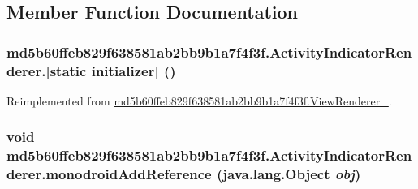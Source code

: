 \subsection{Member Function Documentation}
\hypertarget{classmd5b60ffeb829f638581ab2bb9b1a7f4f3f_1_1_activity_indicator_renderer_ed6f0fb925a7f5d4ef808b3016a59e91}{
\subsubsection[{[static initializer]}]{\setlength{\rightskip}{0pt plus 5cm}md5b60ffeb829f638581ab2bb9b1a7f4f3f.ActivityIndicatorRenderer.\mbox{[}static initializer\mbox{]} ()}}
\label{classmd5b60ffeb829f638581ab2bb9b1a7f4f3f_1_1_activity_indicator_renderer_ed6f0fb925a7f5d4ef808b3016a59e91}




Reimplemented from \hyperlink{classmd5b60ffeb829f638581ab2bb9b1a7f4f3f_1_1_view_renderer__2_a0898cf56fa9a49b653470eaf1608e77}{md5b60ffeb829f638581ab2bb9b1a7f4f3f.ViewRenderer\_}.\hypertarget{classmd5b60ffeb829f638581ab2bb9b1a7f4f3f_1_1_activity_indicator_renderer_5d56cfc2ee6e98e26f68994067dd0cf2}{
\subsubsection[{monodroidAddReference}]{\setlength{\rightskip}{0pt plus 5cm}void md5b60ffeb829f638581ab2bb9b1a7f4f3f.ActivityIndicatorRenderer.monodroidAddReference (java.lang.Object {\em obj})}}
\label{classmd5b60ffeb829f638581ab2bb9b1a7f4f3f_1_1_activity_indicator_renderer_5d56cfc2ee6e98e26f68994067dd0cf2}




